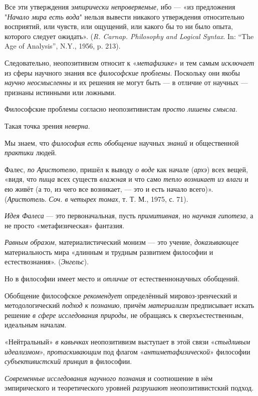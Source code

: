 \documentclass[a4paper,14pt,russian]{extreport}
\begin{document}
Все эти утверждения \emph{эмпирически непроверяемые}, ибо --- «из предложения "\emph{Начало мира есть вода}" нельзя вывести никакого утверждения относительно восприятий, или чувств, или ощущений, или какого бы то ни было опыта, которого следует ожидать». (\emph{R. Carnap. Philosophy and Logical Syntax}. In: ``The Age of Analysis'', N.Y., 1956, p. 213).

Следовательно, неопозитивизм относит к «\emph{метафизике}» и тем самым \emph{исключает} из сферы научного знания все \emph{философские проблемы}. Поскольку они якобы \emph{научно неосмысленны} и их решения не могут быть --- в отличие от научных --- признаны истинными или ложными.

Философские проблемы согласно неопозитивистам \emph{просто лишены смысла}.

Такая точка зрения \emph{неверна}.

Мы знаем, что \emph{философия есть обобщение} научных \emph{знаний} и общественной \emph{практики} людей.

Фалес, \emph{по Аристотелю}, пришёл к выводу \emph{о воде} как начале (\emph{архэ}) всех вещей, «видя, что \emph{пища} всех существ \emph{влажная} и что само \emph{тепло возникает из влаги} и ею живёт (а то, из чего все возникает, --- это и есть начало всего)». (\emph{Аристотель}. \emph{Соч. в четырех томах}, т. Т. М., 1975, с. 71).

\emph{Идея Фалеса} --- это первоначальная, пусть \emph{примитивная}, но \emph{научная гипотеза}, а не просто «метафизическая» фантазия.

\emph{Равным образом}, материалистический монизм --- это учение, \emph{доказывающее} материальность мира «длинным и трудным развитием философии и естествознания». (\emph{Энгельс}).

Но в философии имеет место и \emph{отличие} от естественнонаучных обобщений.

Обобщение философское \emph{рекомендует} определённый мировоз-зренческий и методологический \emph{подход к познанию}, причём \emph{материализм} предписывает искать решение \emph{в сфере исследования природы}, не обращаясь к сверхъестественным, идеальным началам.

«Нейтральный» \emph{в кавычках} неопозитивизм выступает в этой связи «\emph{стыдливым идеализмом}», \emph{протаскивающим} под флагом «\emph{антиметафизической}» философии \emph{субъективистский принцип} в философии.

\emph{Современные исследования научного познания} и соотношение в нём эмпирического и теоретического уровней \emph{разрушают} неопозитивистский подход.
\end{document}
